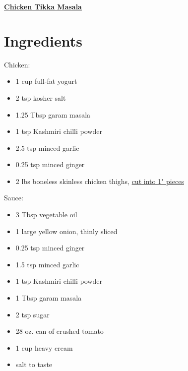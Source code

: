 \documentclass[11pt]{article}
\begin{document}
	\begin{center}\begin{huge}\underline{\textbf{Chicken Tikka Masala}}\end{huge}\end{center}

	\section*{Ingredients}
	Chicken:\vspace*{-1.5ex}
	\begin{itemize}%
		\item 1 cup full-fat yogurt
		\item 2 tsp kosher salt
		\item 1.25 Tbsp garam masala
		\item 1 tsp Kashmiri chilli powder
		\item 2.5 tsp minced garlic
		\item 0.25 tsp minced ginger
		\item 2 lbs boneless skinless chicken thighs, \underline{cut into 1" pieces}
	\end{itemize}
	
	Sauce:\vspace*{-1.5ex}
	\begin{itemize}
		\item 3 Tbsp vegetable oil
		\item 1 large yellow onion, thinly sliced
		\item 0.25 tsp minced ginger
		\item 1.5 tsp minced garlic
		\item 1 tsp Kashmiri chilli powder
		\item 1 Tbsp garam masala
		\item 2 tsp sugar
			
		\item 28 oz. can of crushed tomato
		\item 1 cup heavy cream
		\item salt to taste
	\end{itemize}
	
\end{document}
